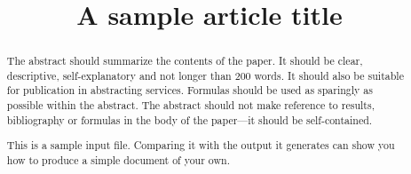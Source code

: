 \documentclass[aos,preprint]{imsart}
\theoremstyle{remark}
\begin{document}
\begin{frontmatter}
\title{A sample article title}


\begin{abstract}
The abstract should summarize the contents of the paper.
It should be clear, descriptive, self-explanatory and not longer
than 200 words. It should also be suitable for publication in
abstracting services. Formulas should be used as sparingly as
possible within the abstract. The abstract should not make
reference to results, bibliography or formulas in the body
of the paper---it should be self-contained.

This is a sample input file.  Comparing it with the output it
generates can show you how to produce a simple document of
your own.
\end{abstract}

\begin{keyword}[class=MSC2020]
\end{keyword}

\begin{keyword}
\end{keyword}

\end{frontmatter}
\end{document}
